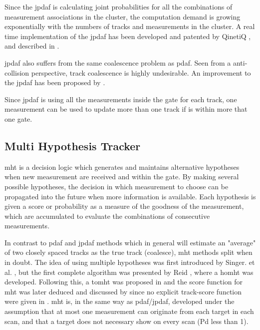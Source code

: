 Since the \gls{jpdaf} is calculating joint probabilities for all the combinations of \gls{measurement} associations in the cluster, the computation demand is growing exponentially with the numbers of tracks and \glspl{measurement} in the cluster. A real time implementation of the \gls{jpdaf} has been developed and patented by QinetiQ \cite{QinetiQ2003}, and described in \cite{Horridge}.

\gls{jpdaf} also suffers from the same coalescence problem as \gls{pdaf}. Seen from a anti-collision perspective, track coalescence is highly undesirable. An improvement to the \gls{jpdaf} has been proposed by \cite{Blom2000}.

Since \gls{jpdaf} is using all the \glspl{measurement} inside the gate for each track, one \gls{measurement} can be used to update more than one track if is within more that one gate.

\subsection{Multi Hypothesis Tracker}
\label{sec:mht}
\gls{mht} is a decision logic which generates and maintains alternative hypotheses when new \gls{measurement} are received and within the gate. By making several possible hypotheses, the decision in which \gls{measurement} to choose can be propagated into the future when more information is available. Each hypothesis is given a \gls{score} or probability as a measure of the goodness of the \gls{measurement}, which are accumulated to evaluate the combinations of consecutive \glspl{measurement}.

In contrast to \gls{pdaf} and \gls{jpdaf} methods which in general will estimate an "average" of two closely spaced tracks as the true track (coalesce), \gls{mht} methods split when in doubt. The idea of using multiple hypotheses was first introduced by Singer. et al. \cite{Singer1974}, but the first complete algorithm was presented by Reid \cite{Reid1979}, where a \gls{homht} was developed. Following this, a \gls{tomht} was proposed in \cite{Kurien1990} and the \gls{score} function for \gls{mht} was later deduced and discussed by \cite{Bar-Shalom2007} since no explicit track-score function were given in \cite{Kurien1990}. \gls{mht} is, in the same way as \gls{pdaf}/\gls{jpdaf}, developed under the assumption that at most one \gls{measurement} can originate from each \gls{target} in each scan, and that a \gls{target} does not necessary show on every scan (\gls{Pd} less than 1).

